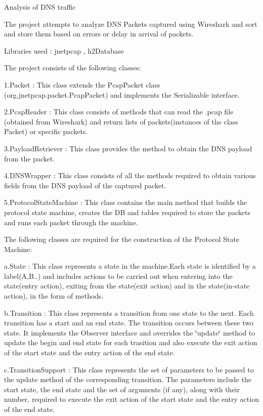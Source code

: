 Analysis of D\-N\-S traffic

The project attempts to analyze D\-N\-S Packets captured using Wireshark and sort and store them based on errors or delay in arrival of packets.

Libraries used \-: jnetpcap , h2\-Database

The project consists of the following classes\-:

1.\-Packet \-: This class extends the Pcap\-Packet class (org.\-jnetpcap.\-packet.\-Pcap\-Packet) and implements the Serializable interface.

2.\-Pcap\-Reader \-: This class consists of methods that can read the .pcap file (obtained from Wireshark) and return lists of packets(instances of the class Packet) or specific packets.

3.\-Payload\-Retriever \-: This class provides the method to obtain the D\-N\-S payload from the packet.

4.\-D\-N\-S\-Wrapper \-: This class consists of all the methods required to obtain various fields from the D\-N\-S payload of the captured packet.

5.\-Protocol\-State\-Machine \-: This class contains the main method that builds the protocol state machine, creates the D\-B and tables required to store the packets and runs each packet through the machine.

The following classes are required for the construction of the Protocol State Machine\-:

a.\-State \-: This class represents a state in the machine.\-Each state is identified by a label(A,B..) and includes actions to be carried out when entering into the state(entry action), exiting from the state(exit action) and in the state(in-\/state action), in the form of methods.

b.\-Transition \-: This class represents a transition from one state to the next. Each transition has a start and an end state. The transition occurs between these two state. It implements the Observer interface and overrides the \char`\"{}update\char`\"{} method to update the begin and end state for each trasition and also execute the exit action of the start state and the entry action of the end state.

c.\-Transition\-Support \-: This class represents the set of parameters to be passed to the update method of the corresponding transition. The parameters include the start state, the end state and the set of arguments (if any), along with their number, required to execute the exit action of the start state and the entry action of the end state.


